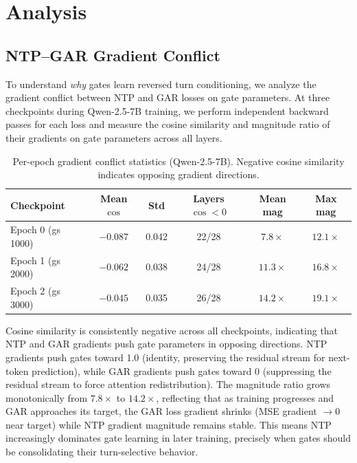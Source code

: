 \documentclass[11pt,a4paper]{article}
\newcommand{\gar}{\textsc{GAR}}
\begin{document}
\section{Analysis}
\label{sec:analysis}

\subsection{NTP--\gar{} Gradient Conflict}
\label{sec:gradient-conflict}

To understand \emph{why} gates learn reversed turn conditioning, we analyze the gradient conflict between NTP and \gar{} losses on gate parameters.
At three checkpoints during Qwen-2.5-7B training, we perform independent backward passes for each loss and measure the cosine similarity and magnitude ratio of their gradients on gate parameters across all layers.

\begin{table}[H]
\centering
\caption{Per-epoch gradient conflict statistics (Qwen-2.5-7B). Negative cosine similarity indicates opposing gradient directions.}
\label{tab:gradient-epoch}
\begin{tabular}{lccccc}
\toprule
\textbf{Checkpoint} & \textbf{Mean $\cos$} & \textbf{Std} & \textbf{Layers $\cos < 0$} & \textbf{Mean mag} & \textbf{Max mag} \\
\midrule
Epoch 0 (gs 1000) & $-0.087$ & 0.042 & 22/28 & $7.8\times$ & $12.1\times$ \\
Epoch 1 (gs 2000) & $-0.062$ & 0.038 & 24/28 & $11.3\times$ & $16.8\times$ \\
Epoch 2 (gs 3000) & $-0.045$ & 0.035 & 26/28 & $14.2\times$ & $19.1\times$ \\
\bottomrule
\end{tabular}
\end{table}

Cosine similarity is consistently negative across all checkpoints, indicating that NTP and \gar{} gradients push gate parameters in opposing directions.
NTP gradients push gates toward 1.0 (identity, preserving the residual stream for next-token prediction), while \gar{} gradients push gates toward 0 (suppressing the residual stream to force attention redistribution).
The magnitude ratio grows monotonically from $7.8\times$ to $14.2\times$, reflecting that as training progresses and \gar{} approaches its target, the \gar{} loss gradient shrinks (MSE gradient $\to 0$ near target) while NTP gradient magnitude remains stable.
This means NTP increasingly dominates gate learning in later training, precisely when gates should be consolidating their turn-selective behavior.
\end{document}
